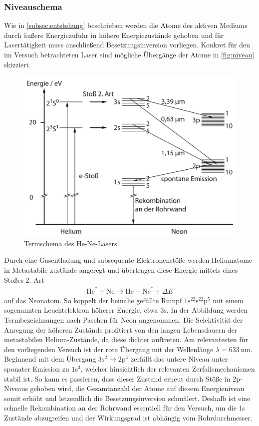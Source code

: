 \subsubsection{Niveauschema}
Wie in \autoref{subsec:entstehung} beschrieben werden die Atome des aktiven Mediums durch äußere Energiezufuhr in höhere Energiezustände gehoben und für Lasertätigkeit muss anschließend Besetzungsinversion vorliegen.
Konkret für den im Versuch betrachteten Laser sind mögliche Übergänge der Atome in \autoref{fig:niveau} skizziert.
\begin{figure}[H]
    \centering
    \includegraphics[scale=0.4]{Ressourcen/niveau.png}
    \caption{Termschema des He-Ne-Lasers\cite{eichler}}\label{fig:niveau}
\end{figure}
Durch eine Gasentladung und subsequente Elektronenstöße werden Heliumatome in Metastabile zustände  angeregt und übertragen diese Energie mittels eines Stoßes 2. Art 
\begin{align}
  \text{He}^* + \text{Ne} \rightarrow \text{He} + \text{Ne}^* + \Delta E
\end{align}
auf das Neonatom. So koppelt der beinahe gefüllte Rumpf $\mathrm{1s^22s^22p^5}$ mit einem sogenannten Leuchtelektron höherer Energie, etwa $\mathrm{3s}$. In der Abbildung werden Termbezeichnungen nach Paschen für Neon angenommen.
Die Selektivität der Anregung der höheren Zustände profitiert von den langen Lebensdauern der metastabilen Helium-Zustände, da diese dichter auftreten.
Am relevantesten für den vorliegenden Versuch ist der rote Übergang mit der Wellenlänge $\lambda=\SI{633}{\nano\meter}$. Beginnend mit dem Übergang $\mathrm{3s^2\rightarrow2p^4}$ zerfällt das untere Niveau unter sponater Emission zu $\mathrm{1s^3}$, welcher hinsichtlich der relevanten Zerfallsmechanismen stabil ist. So kann es passieren, dass dieser Zustand erneut durch Stöße in 2p-Niveaus gehoben wird, die Gesamtanzahl der Atome auf diesem Energieniveau somit erhöht und letzendlich die Besetzungsinversion schmälert.
Deshalb ist eine schnelle Rekombination an der Rohrwand essentiell für den Versuch, um die 1s Zustände abzugreifen und der Wirkungsgrad ist abhängig vom Rohrdurchmesser.
